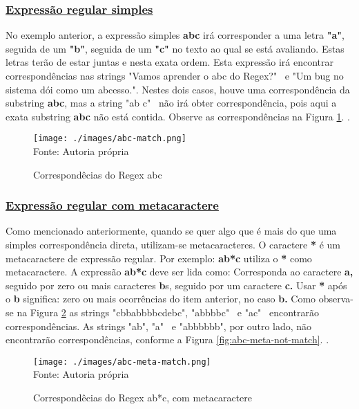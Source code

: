 \subsubsection{\underline{Expressão regular simples}}

No exemplo anterior, a expressão simples
\textbf{abc}
irá corresponder a uma letra
\textbf{"a"},
seguida de um
\textbf{"b"},
seguida de um
\textbf{"c"}
no texto ao qual se está avaliando.
Estas letras terão de estar juntas e nesta exata ordem.
Esta expressão irá encontrar correspondências nas strings
"Vamos aprender o abc do Regex?"~
e
"Um bug no sistema dói como um abcesso.".
Nestes dois casos, houve uma correspondência da substring
\textbf{abc},
mas a string
"ab c"~
não irá obter correspondência, pois aqui a exata substring
\textbf{abc}
não está contida. Observe as correspondências na
Figura \ref{fig:abc-match}.
\cite{mdn-regex}.

\begin{figure}[H]
    \centering
    \caption{Correspondêcias do Regex abc}
    \texttt{[image: ./images/abc-match.png]}
    \label{fig:abc-match} \\
    \textnormal{\fontsize{10pt}{12pt}Fonte: Autoria própria}
\end{figure}

\subsubsection{\underline{Expressão regular com metacaractere}}

Como mencionado anteriormente, quando se quer algo que é mais do
que uma simples correspondência direta, utilizam-se metacaracteres.
O caractere
\textbf{*}
é um metacaractere de expressão regular. Por exemplo:
\textbf{ab*c}
utiliza o
\textbf{*}
como metacaractere. A expressão
\textbf{ab*c}
deve ser lida como: Corresponda ao caractere
\textbf{a,}
seguido por zero ou mais caracteres
\textbf{b}s,
seguido por um caractere
\textbf{c.}
Usar
\textbf{*}
após o
\textbf{b}
significa: zero ou mais ocorrências do item anterior, no caso
\textbf{b.}
Como observa-se na
Figura \ref{fig:abc-meta-match}
as strings "cbbabbbbcdebc", "abbbbc"~ e "ac"~
encontrarão correspondências. As strings "ab", "a"~ e "abbbbbb", por
outro lado, não encontrarão correspondências, conforme a
Figura \ref{fig:abc-meta-not-match}.
\cite{mdn-regex}.

\begin{figure}[H]
    \centering
    \caption{Correspondêcias do Regex ab*c, com metacaractere}
    \texttt{[image: ./images/abc-meta-match.png]}
    \label{fig:abc-meta-match} \\
    \textnormal{\fontsize{10pt}{12pt}Fonte: Autoria própria}
\end{figure}


